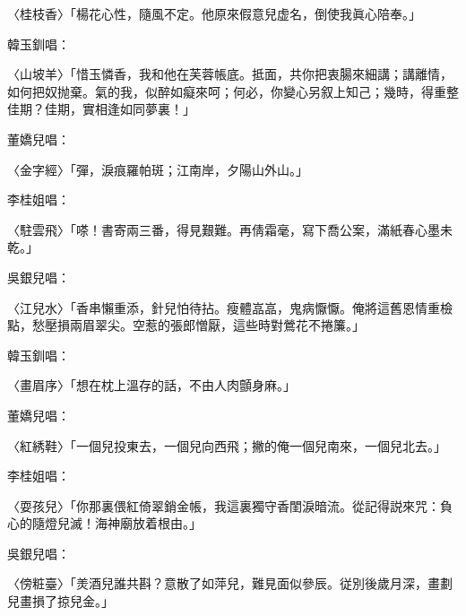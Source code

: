 \begin{myquote}
{\markfont〈桂枝香〉}「楊花心性，隨風不定。他原來假意兒虚名，倒使我眞心陪奉。」
\end{myquote}

韓玉釧唱：

\begin{myquote}
{\markfont〈山坡羊〉}「惜玉憐香，我和他在芙蓉帳底。抵面，共你把衷腸來細講；講離情，如何把奴抛棄。氣的我，似醉如癡來呵；何必，你變心另叙上知己；幾時，得重整佳期？佳期，實相逢如同夢裏！」
\end{myquote}

董嬌兒唱：

\begin{myquote}
{\markfont〈金字經〉}「彈，淚痕羅帕斑；江南岸，夕陽山外山。」
\end{myquote}

李桂姐唱：

\begin{myquote}
{\markfont〈駐雲飛〉}「嗏！書寄兩三番，得見艱難。再倩霜毫，寫下喬公案，滿紙春心墨未乾。」
\end{myquote}

吳銀兒唱：

\begin{myquote}
{\markfont〈江兒水〉}「香串懶重添，針兒怕待拈。瘦體嵓嵓，鬼病懨懨。俺將這舊恩情重檢點，愁壓損兩眉翠尖。空惹的張郎憎厭，這些時對鶯花不捲簾。」
\end{myquote}

韓玉釧唱：

\begin{myquote}
{\markfont〈畫眉序〉}「想在枕上溫存的話，不由人肉顫身麻。」
\end{myquote}

董嬌兒唱：

\begin{myquote}
{\markfont〈紅綉鞋〉}「一個兒投東去，一個兒向西飛；撇的俺一個兒南來，一個兒北去。」
\end{myquote}

李桂姐唱：

\begin{myquote}
{\markfont〈耍孩兒〉}「你那裏偎紅倚翠銷金帳，我這裏獨守香閨淚暗流。從記得説來咒：負心的隨燈兒滅！海神廟放着根由。」
\end{myquote}

吳銀兒唱：

\begin{myquote}
{\markfont〈傍粧臺〉}「羙酒兒誰共斟？意散了如萍兒，難見面似參辰。従別後歲月深，畫劃兒畫損了掠兒金。」
\end{myquote}

